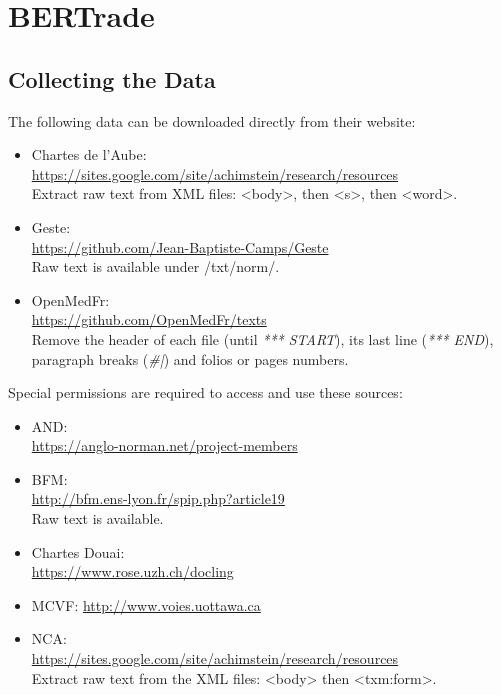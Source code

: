 \chapter{BERTrade}

\section{Collecting the Data}
\label{subsec:collectdata}
The following data can be downloaded directly from their website:
\begin{itemize}
    \item Chartes de l'Aube: \\ \url{https://sites.google.com/site/achimstein/research/resources} \\
          Extract raw text from XML files: <body>, then <s>, then <word>.
    \item Geste: \\ \url{https://github.com/Jean-Baptiste-Camps/Geste} \\
          Raw text is available under /txt/norm/.
    \item OpenMedFr: \\ \url{https://github.com/OpenMedFr/texts} \\
          Remove the header of each file (until \textit{*** START}), its last line (\textit{*** END}), paragraph breaks (\textit{\#|}) and folios or pages numbers.
\end{itemize}

Special permissions are required to access and use these sources:
\begin{itemize}
    \item AND: \\ \url{https://anglo-norman.net/project-members}
    \item BFM: \\ \url{http://bfm.ens-lyon.fr/spip.php?article19} \\
          Raw text is available.
    \item Chartes Douai: \\
          \url{https://www.rose.uzh.ch/docling}
    \item MCVF: \url{http://www.voies.uottawa.ca}
    \item NCA: \\ \url{https://sites.google.com/site/achimstein/research/resources} \\
          Extract raw text from the XML files: <body> then <txm:form>.
\end{itemize}



